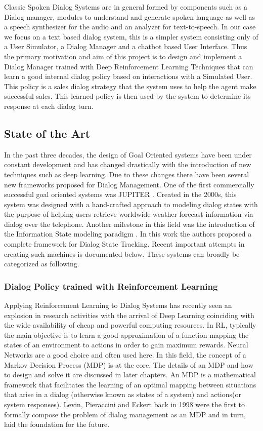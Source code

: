 \documentclass[12pt]{extarticle}
\numberwithin{equation}{section}
\begin{document}
	Classic Spoken Dialog Systems are in general formed by components such as a Dialog manager, modules to understand and generate spoken language as well as a speech synthesizer for the audio and an analyzer for text-to-speech. In our case we focus on a text based dialog system, this is a simpler system consisting only of a User Simulator, a Dialog Manager and a chatbot based User Interface. Thus the primary motivation and aim of this project is to design and implement a Dialog Manager trained with Deep Reinforcement Learning Techniques that can learn a good internal dialog policy based on interactions with a Simulated User. This policy is a sales dialog strategy that the system uses to help the agent make successful sales. This learned policy is then used by the system to determine its response at each dialog turn.
	\subsection{State of the Art}
	In the past three decades, the design of Goal Oriented systems have been under constant development and has changed drastically with the introduction of new techniques such as deep learning. Due to these changes there have been several new frameworks proposed for Dialog Management. One of the first commercially successful goal oriented systems was JUPITER \cite{zue_jupiter}. Created in the 2000s, this system was designed with a hand-crafted approach to modeling dialog states with the purpose of helping users retrieve worldwide weather forecast information via dialog over the telephone. Another milestone in this field was the introduction of the Information State modeling paradigm \cite{Larsson:2000:ISD:973935.973943}. In this work the authors proposed a complete framework for Dialog State Tracking.
	Recent important attempts in creating such machines is documented below. These systems can broadly be categorized as following.
	\subsubsection{Dialog Policy trained with Reinforcement Learning}
	Applying Reinforcement Learning to Dialog Systems has recently seen an explosion in research activities with the arrival of Deep Learning coinciding with the wide availability of cheap and powerful computing resources. In RL, typically the main objective is to learn a good approximation of a function mapping the states of an environment to actions in order to gain maximum rewards. Neural Networks are a good choice and often used here. In this field, the concept of a Markov Decision Process (MDP) is at the core. The details of an MDP and how to design and solve it are discussed in later chapters. An MDP is a mathematical framework that facilitates the learning of an optimal mapping between situations that arise in a dialog (otherwise known as states of a system) and actions(or system responses)\cite{mdp-bellmann}. Levin, Pieraccini and Eckert back in 1998 were the first to formally compose the problem of dialog management as an MDP \cite{mdp-pieraccini} and in turn, laid the foundation for the future.
	
\end{document}
